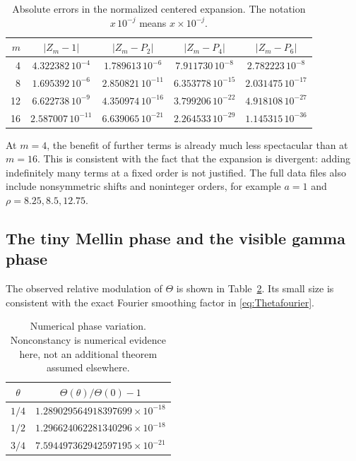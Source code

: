 \documentclass[11pt,letterpaper]{article}
\numberwithin{equation}{section}
\theoremstyle{definition}
\theoremstyle{remark}
\begin{document}
\begin{table}[htbp]
\centering\small
\begin{tabular}{rcccc}
\toprule
$m$ & $|Z_m-1|$ & $|Z_m-P_2|$ & $|Z_m-P_4|$ & $|Z_m-P_6|$\\
\midrule
4  & $4.322382\,10^{-4}$ & $1.789613\,10^{-6}$ & $7.911730\,10^{-8}$ & $2.782223\,10^{-8}$\\
8  & $1.695392\,10^{-6}$ & $2.850821\,10^{-11}$& $6.353778\,10^{-15}$& $2.031475\,10^{-17}$\\
12 & $6.622738\,10^{-9}$ & $4.350974\,10^{-16}$& $3.799206\,10^{-22}$& $4.918108\,10^{-27}$\\
16 & $2.587007\,10^{-11}$& $6.639065\,10^{-21}$& $2.264533\,10^{-29}$& $1.145315\,10^{-36}$\\
\bottomrule
\end{tabular}
\caption{Absolute errors in the normalized centered expansion. The notation
$x\,10^{-j}$ means $x\times10^{-j}$.}
\label{tab:centered}
\end{table}

At $m=4$, the benefit of further terms is already much less spectacular
than at $m=16$. This is consistent with the fact that the expansion is
divergent: adding indefinitely many terms at a fixed order is not justified.
The full data files also include nonsymmetric shifts and noninteger
orders, for example $a=1$ and $\rho=8.25,8.5,12.75$.

\subsection{The tiny Mellin phase and the visible gamma phase}
The observed relative modulation of $\Theta$ is shown in
Table~\ref{tab:theta}. Its small size is consistent with the exact Fourier
smoothing factor in \eqref{eq:Thetafourier}.

\begin{table}[htbp]
\centering
\begin{tabular}{cc}
\toprule
$\theta$ & $\Theta(\theta)/\Theta(0)-1$\\
\midrule
$1/4$ & $1.289029564918397699\times10^{-18}$\\
$1/2$ & $1.296624062281340296\times10^{-18}$\\
$3/4$ & $7.594497362942597195\times10^{-21}$\\
\bottomrule
\end{tabular}
\caption{Numerical phase variation. Nonconstancy is numerical evidence
here, not an additional theorem assumed elsewhere.}
\label{tab:theta}
\end{table}
\end{document}
